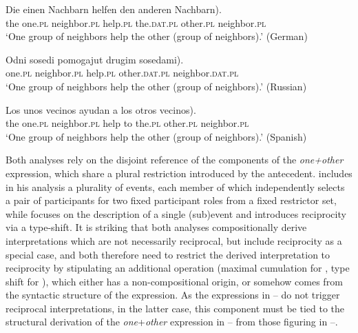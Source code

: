 \documentclass[output=paper,colorlinks,citecolor=brown]{langscibook}
\begin{document}
\ea\label{ex:Einen}
\gll Die einen Nachbarn helfen den anderen \minsp{(} Nachbarn).\\
the one.\textsc{pl} neighbor.\textsc{pl} help.\textsc{pl} the.\textsc{dat.\textsc{pl}} other.\textsc{pl} {} neighbor.\textsc{pl}\\
\glt `One group of neighbors help the other (group of neighbors).' \hfill (German)
\z

\ea\label{ex:Odni}
\gll Odni sosedi pomogajut drugim \minsp{(} sosedami).\\
one.\textsc{pl} neighbor.\textsc{pl} help.\textsc{pl} other.\textsc{dat.\textsc{pl}} {} neighbor.\textsc{dat.\textsc{pl}}\\
\glt `One group of neighbors help the other (group of neighbors).' \hfill (Russian)
\z

\ea\label{ex:Unos}
\gll Los unos vecinos ayudan a los otros \minsp{(} vecinos).\\
the one.\textsc{pl} neighbor.\textsc{pl} help to the.\textsc{pl} other.\textsc{pl} {} neighbor.\textsc{pl}\\

\glt `One group of neighbors help the other (group of neighbors).' \hfill (Spanish)
\z 

\noindent Both analyses rely on the disjoint reference of the components of the \textit{one+other} expression, which share a plural restriction introduced by the antecedent. \citet{v10} %
includes in his analysis a plurality of events, each member of which independently selects a pair of participants for two fixed participant roles from a fixed restrictor set, while \citet{z14} %
focuses on the description of a single (sub)event and introduces reciprocity via a type-shift. It is striking that both analyses compositionally derive interpretations which are not necessarily reciprocal, but include reciprocity as a special case, and both therefore need to restrict the derived interpretation to reciprocity by stipulating an additional operation (maximal cumulation for \citeauthor{v10} %
, type shift for \citeauthor{z14}%
), which either has a non-compositional origin, or somehow comes from the syntactic structure of the expression. As the expressions in -- do not trigger reciprocal
interpretations, in the latter case, this component must be tied to the structural derivation of the \textit{one}+\textit{other} expression in -- from those figuring in --.
\end{document}
